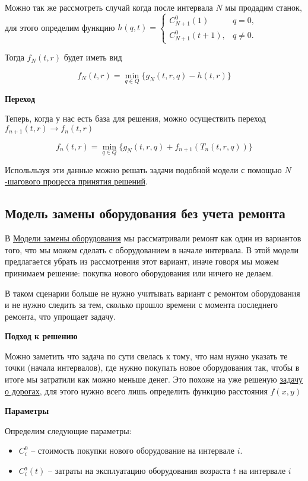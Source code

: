 Можно так же рассмотреть случай когда после интервала $N$ мы продадим станок, для этого определим функцию $h(q, t) = \begin{cases}
	C_{N+1}^0 (1) & q = 0, \\
	C_{N+1}^0 (t+1), & q \neq 0.
\end{cases}$

Тогда $f_N(t, r)$ будет иметь вид

\[
\boxed{ f_N(t,r) = \min_{q \in Q} \Big\{ g_N(t,r, q) - h(t,r) \Big\} }
\]

\bigskip

\textbf{Переход}

Теперь, когда у нас есть база для решения, можно осуществить переход $f_{n+1}(t, r) \to f_n(t, r)$

\[
\boxed{ f_n(t,r) = \min_{q \in Q} \Big\{ g_N(t, r, q) + f_{n+1}(T_n(t, r, q)) \Big\} }
\]

Испольльзуя эти данные можно решать задачи подобной модели с помощью \hyperref[alg:n_step_process]{$N$-шагового процесса принятия решений}.

\subsection{Модель замены оборудования без учета ремонта}

В \hyperref[pr:equipment_replacement_model]{Модели замены оборудования} мы рассматривали ремонт как один из вариантов того, что мы можем сделать с оборудованием в начале интервала. В этой модели предлагается убрать из рассмотрения этот вариант, иначе говоря мы можем принимаем решение: покупка нового оборудования или ничего не делаем.

В таком сценарии больше не нужно учитывать вариант с ремонтом оборудования и не нужно следить за тем, сколько прошло времени с момента последнего ремонта, что упрощает задачу.

\bigskip

\textbf{Подход к решению}

Можно заметить что задача по сути свелась к тому, что нам нужно указать те точки (начала интервалов), где нужно покупать новое оборудования так, чтобы в итоге мы затратили как можно меньше денег. Это похоже на уже решеную \hyperref[pr:road]{задачу о дорогах}, для этого нужно всего лишь определить функцию расстояния $f(x, y)$

\textbf{Параметры}

Определим следующие параметры:
\begin{itemize}[nosep]
	\item $C_i^0$ -- стоимость покупки нового оборудование на интервале $i$.
	\item $C_i^\text{э} (t)$ -- затраты на эксплуатацию оборудования возраста $t$ на интервале $i$
\end{itemize}

